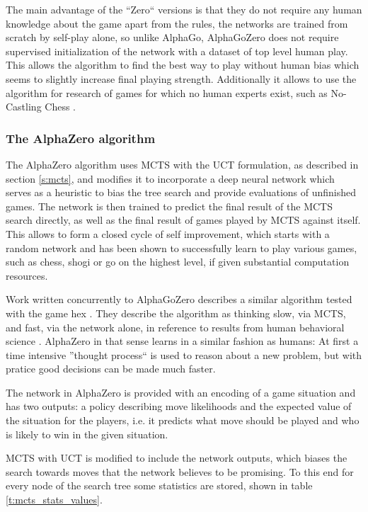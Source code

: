 \documentclass[12pt,onecolumn,oneside,titlepage]{article}
\begin{document}
The main advantage of the ``Zero`` versions is that they do not require any human knowledge about the game apart from the rules, the networks are trained from scratch by self-play alone, so unlike AlphaGo, AlphaGoZero does not require supervised initialization 
of the network with a dataset of top level human play. This allows the algorithm to find the best way to play without human bias which seems to slightly increase final playing strength.
Additionally it allows to use the algorithm for research of games for which no human experts exist, such as No-Castling Chess \cite{NoCastleChess}.

\subsubsection{The AlphaZero algorithm}
\label{s:azalgo}

The AlphaZero algorithm \cite{silver2018general} uses MCTS with the UCT formulation, as described in section \ref{s:mcts}, and modifies it to incorporate a deep neural network which serves as a heuristic to bias the tree search and provide evaluations of unfinished games.
The network is then trained to predict the final result of the MCTS search directly, as well as the final result of games played by MCTS against itself.
This allows to form a closed cycle of self improvement, which starts with a random network and has been shown to successfully learn to play various games, such as chess, shogi or go on the highest level, if given substantial computation resources.

Work written concurrently to AlphaGoZero describes a similar algorithm tested with the game hex \cite{anthony2017thinking}. They describe the algorithm as thinking slow, via MCTS, and fast, via the network alone, in reference to results from human behavioral science \cite{kahneman2011thinking}.
AlphaZero in that sense learns in a similar fashion as humans: At first a time intensive ''thought process`` is used to reason about a new problem, but with pratice good decisions can be made much faster.

The network in AlphaZero is provided with an encoding of a game situation and has two outputs: a policy describing move likelihoods and the expected value of the situation for the players, i.e. it predicts what move should be played and who is likely to win in the given situation.

MCTS with UCT is modified to include the network outputs, which biases the search towards moves that the network believes to be promising.
To this end for every node of the search tree some statistics are stored, shown in table \ref{t:mcts_stats_values}.
\end{document}
